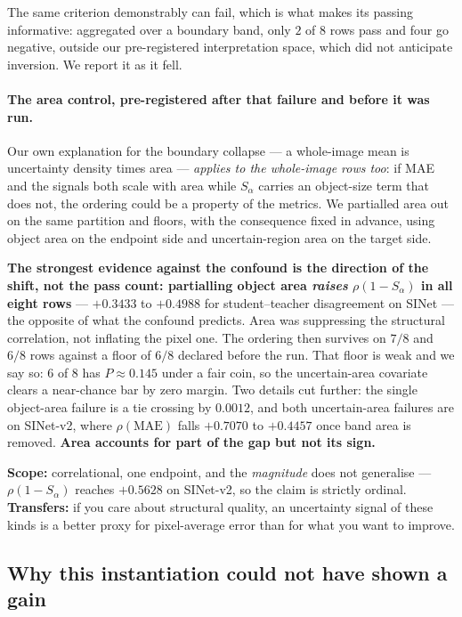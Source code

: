 \documentclass{article} %
\begin{document}
The same criterion demonstrably can fail, which is what makes its passing informative: aggregated over
a boundary band, only $2$ of $8$ rows pass and four go negative, outside our pre-registered
interpretation space, which did not anticipate inversion. We report it as it fell.

\paragraph{The area control, pre-registered after that failure and before it was run.} Our own
explanation for the boundary collapse --- a whole-image mean is uncertainty density times area ---
\emph{applies to the whole-image rows too}: if MAE and the signals both scale with area while
$S_\alpha$ carries an object-size term that does not, the ordering could be a property of the metrics.
We partialled area out on the same partition and floors, with the consequence fixed in advance, using
object area on the endpoint side and uncertain-region area on the target side.

\textbf{The strongest evidence against the confound is the direction of the shift, not the pass count:
partialling object area \emph{raises} $\rho(1-S_\alpha)$ in all eight rows} --- $+0.3433$ to $+0.4988$
for student--teacher disagreement on SINet --- the opposite of what the confound predicts. Area was
suppressing the structural correlation, not inflating the pixel one. The ordering then survives on
$7/8$ and $6/8$ rows against a floor of $6/8$ declared before the run. That floor is weak and we say
so: $6$ of $8$ has $P \approx 0.145$ under a fair coin, so the uncertain-area covariate clears a
near-chance bar by zero margin. Two details cut further: the single object-area failure is a tie
crossing by $0.0012$, and both uncertain-area failures are on SINet-v2, where $\rho(\mathrm{MAE})$
falls $+0.7070$ to $+0.4457$ once band area is removed. \textbf{Area accounts for part of the gap but
not its sign.}

\textbf{Scope:} correlational, one endpoint, and the \emph{magnitude} does not generalise ---
$\rho(1-S_\alpha)$ reaches $+0.5628$ on SINet-v2, so the claim is strictly ordinal.
\textbf{Transfers:} if you care about structural quality, an uncertainty signal of these kinds is a
better proxy for pixel-average error than for what you want to improve.

\subsection{Why this instantiation could not have shown a gain}
\label{sec:diss-instantiation}
\end{document}

